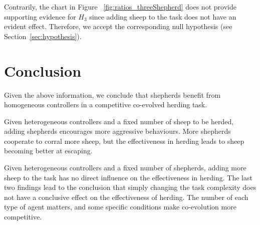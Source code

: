 \documentclass[conference]{IEEEtran}
\begin{document}

Contrarily, the chart in Figure ~\ref{fig:ratios_threeShepherd} does not provide supporting evidence for $H_3$ since adding sheep to the task does not have an evident effect. Therefore, we accept the corresponding null hypothesis (see Section~\ref{sec:hypothesis}). 

\section{Conclusion}
\label{sec:conclusion}
Given the above information, we conclude that shepherds benefit from homogeneous controllers in a competitive co-evolved herding task. 

Given heterogeneous controllers and a fixed number of sheep to be herded, adding shepherds encourages more aggressive behaviours. More shepherds cooperate to corral more sheep, but the effectiveness in herding leads to sheep becoming better at escaping. 

Given heterogeneous controllers and a fixed number of shepherds, adding more sheep to the task has no direct influence on the effectiveness in herding.
The last two findings lead to the conclusion that simply changing the task complexity does not have a conclusive effect on the effectiveness of herding. The number of each type of agent matters, and some specific conditions make co-evolution more competitive.


\printbibliography
\end{document}
